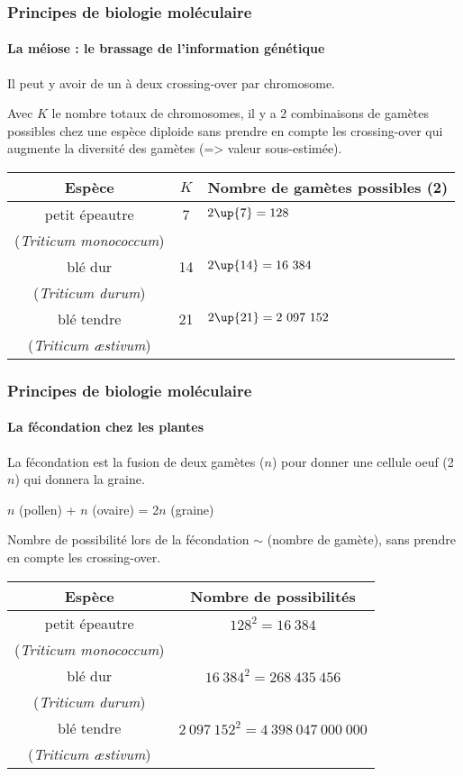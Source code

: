 \begin{frame}
\frametitle{Principes de biologie moléculaire}
\framesubtitle{La méiose : le brassage de l'information génétique}

Il peut y avoir de un à deux crossing-over par chromosome.

Avec $K$ le nombre totaux de chromosomes, il y a 2 combinaisons de gamètes possibles chez une espèce diploide sans prendre en compte les crossing-over qui augmente la diversité des gamètes (=> valeur sous-estimée).

\vspace{.5cm}

\begin{tabular}{ c c p{} }
\hline
Espèce & $K$ & Nombre de gamètes possibles (2\up{$K$}) \\
\hline
petit épeautre & 7 & $2\up{7} = 128$ \\
(\textit{Triticum monococcum}) & & \\
blé dur & 14 & $2\up{14} = 16~384$ \\
(\textit{Triticum durum}) & & \\
blé tendre & 21 & $2\up{21} = 2~097~152$ \\
(\textit{Triticum æstivum})  & & \\
\hline
\end{tabular}

\end{frame}




\begin{frame}
\frametitle{Principes de biologie moléculaire}
\framesubtitle{La fécondation chez les plantes}

La fécondation est la fusion de deux gamètes ($n$) pour donner une cellule oeuf (2$n$) qui donnera la graine.

\begin{block}{}
\centering \Large $n$ (pollen) + $n$ (ovaire) =  2$n$ (graine)
\end{block}

Nombre de possibilité lors de la fécondation $\sim$ (nombre de gamète), sans prendre en compte les crossing-over.
\begin{center}

\begin{tabular}{ c c }
\hline
Espèce & Nombre de possibilités \\
\hline
petit épeautre & $128^2 = 16~384$ \\
(\textit{Triticum monococcum}) & \\
blé dur & $16~384^2 = 268~435~456$ \\
(\textit{Triticum durum}) & \\
blé tendre & $2~097~152^2 = 4~398~047~000~000$ \\
(\textit{Triticum æstivum}) & \\
\hline
\end{tabular}

\end{center}


\end{frame}

